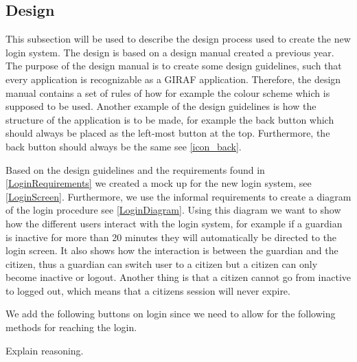 \subsection{Design}

This subsection will be used to describe the design process used to create the
new login system. The design is based on a design manual created a previous
year. The purpose of the design manual is to create some design guidelines, such
that every application is recognizable as a GIRAF application. Therefore, the
design manual contains a set of rules of how for example the colour scheme which
is supposed to be used. Another example of the design guidelines is how the
structure of the application is to be made, for example the back button which
should always be placed as the left-most button at the top. Furthermore, the
back button should always be the same see \autoref{icon_back}. 


Based on the design guidelines and the requirements found in
\autoref{LoginRequirements} we created a mock up for the new login system,
see \autoref{LoginScreen}. Furthermore, we use the informal requirements to
create a diagram of the login procedure see \autoref{LoginDiagram}. Using this
diagram we want to show how the different users interact with the login system,
for example if a guardian is inactive for more than 20 minutes they will
automatically be directed to the login screen. It also shows how the interaction
is between the guardian and the citizen, thus a guardian can switch user to a
citizen but a citizen can only become inactive or logout. Another thing is that
a citizen cannot go from inactive to logged out, which means that a citizens
session will never expire. 


We add the following buttons on login since we need to allow for the
following methods for reaching the login.


Explain reasoning.